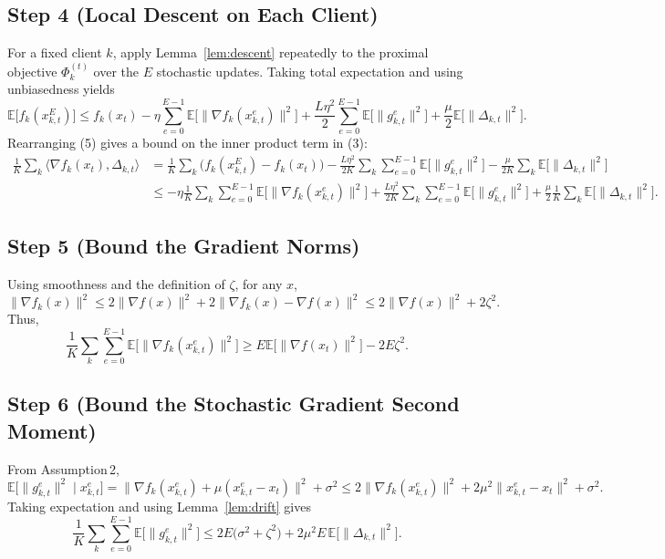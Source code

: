 \documentclass{article}
\newcommand{\EE}{\mathbb{E}}
\begin{document}
\subsection*{Step 4 (Local Descent on Each Client)}
For a fixed client $k$, apply Lemma~\ref{lem:descent} repeatedly to the proximal objective $\Phi_k^{(t)}$ over the $E$ stochastic updates. Taking total expectation and using unbiasedness yields
\[
\EE\!\bigl[f_k(x_{k,t}^{E})\bigr]
\le f_k(x_t)-\eta\sum_{e=0}^{E-1}\EE\!\bigl[\|\nabla f_k(x_{k,t}^{e})\|^{2}\bigr]
   +\frac{L\eta^{2}}{2}\sum_{e=0}^{E-1}\EE\!\bigl[\|g_{k,t}^{e}\|^{2}\bigr]
   +\frac{\mu}{2}\EE\!\bigl[\|\Delta_{k,t}\|^{2}\bigr].
\tag{5}
\]
Rearranging (5) gives a bound on the inner product term in (3):
\[
\begin{aligned}
\frac{1}{K}\sum_{k}\langle \nabla f_k(x_t),\Delta_{k,t}\rangle
&= \frac{1}{K}\sum_{k}\bigl(f_k(x_{k,t}^{E})-f_k(x_t)\bigr)
   -\frac{L\eta^{2}}{2K}\sum_{k}\sum_{e=0}^{E-1}\EE\!\bigl[\|g_{k,t}^{e}\|^{2}\bigr]
   -\frac{\mu}{2K}\sum_{k}\EE\!\bigl[\|\Delta_{k,t}\|^{2}\bigr] \\
&\le -\eta\frac{1}{K}\sum_{k}\sum_{e=0}^{E-1}\EE\!\bigl[\|\nabla f_k(x_{k,t}^{e})\|^{2}\bigr]
   +\frac{L\eta^{2}}{2K}\sum_{k}\sum_{e=0}^{E-1}\EE\!\bigl[\|g_{k,t}^{e}\|^{2}\bigr]
   +\frac{\mu}{2}\frac{1}{K}\sum_{k}\EE\!\bigl[\|\Delta_{k,t}\|^{2}\bigr].
\end{aligned}
\tag{6}
\]

\subsection*{Step 5 (Bound the Gradient Norms)}
Using smoothness and the definition of $\zeta$, for any $x$,
\[
\|\nabla f_k(x)\|^{2}\le 2\|\nabla f(x)\|^{2}+2\|\nabla f_k(x)-\nabla f(x)\|^{2}
\le 2\|\nabla f(x)\|^{2}+2\zeta^{2}.
\tag{7}
\]
Thus,
\[
\frac{1}{K}\sum_{k}\sum_{e=0}^{E-1}\EE\!\bigl[\|\nabla f_k(x_{k,t}^{e})\|^{2}\bigr]
\ge E\EE\!\bigl[\|\nabla f(x_t)\|^{2}\bigr]-2E\zeta^{2}.
\tag{8}
\]

\subsection*{Step 6 (Bound the Stochastic Gradient Second Moment)}
From Assumption 2,
\[
\EE\!\bigl[\|g_{k,t}^{e}\|^{2}\mid x_{k,t}^{e}\bigr]
= \|\nabla f_k(x_{k,t}^{e})+\mu(x_{k,t}^{e}-x_t)\|^{2}+\sigma^{2}
\le 2\|\nabla f_k(x_{k,t}^{e})\|^{2}+2\mu^{2}\|x_{k,t}^{e}-x_t\|^{2}+\sigma^{2}.
\tag{9}
\]
Taking expectation and using Lemma~\ref{lem:drift} gives
\[
\frac{1}{K}\sum_{k}\sum_{e=0}^{E-1}\EE\!\bigl[\|g_{k,t}^{e}\|^{2}\bigr]
\le 2E\bigl(\sigma^{2}+\zeta^{2}\bigr)+2\mu^{2}E\,\EE\!\bigl[\|\Delta_{k,t}\|^{2}\bigr].
\tag{10}
\]
\end{document}
